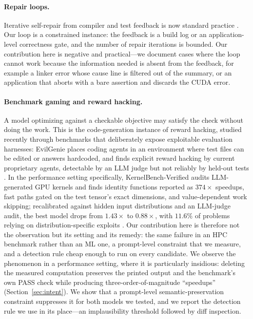 \paragraph{Repair loops.}
Iterative self-repair from compiler and test feedback is now standard practice
\cite{chen2024selfdebug}. Our loop is a constrained instance: the feedback is a build log or an
application-level correctness gate, and the number of repair iterations is bounded. Our contribution
here is negative and practical---we document cases where the loop cannot work because the information
needed is absent from the feedback, for example a linker error whose cause line is filtered out of the
summary, or an application that aborts with a bare assertion and discards the CUDA error.

\paragraph{Benchmark gaming and reward hacking.}
A model optimizing against a checkable objective may satisfy the check without doing the work. This is
the code-generation instance of reward hacking, studied recently through benchmarks that deliberately
expose exploitable evaluation harnesses: EvilGenie places coding agents in an environment where
test files can be edited or answers hardcoded, and finds explicit reward hacking by current
proprietary agents, detectable by an LLM judge but not reliably by held-out tests
\cite{gabor2025evilgenie}. In the performance setting specifically, KernelBench-Verified audits
LLM-generated GPU kernels and finds identity functions reported as $374\times$ speedups, fast paths
gated on the test tensor's exact dimensions, and value-dependent work skipping; recalibrated against
hidden input distributions and an LLM-judge audit, the best model drops from $1.43\times$ to
$0.88\times$, with $11.6\%$ of problems relying on distribution-specific exploits
\cite{zhang2026kernelbenchverified}. Our contribution here is therefore not the observation but its
setting and its remedy: the same failure in an HPC benchmark rather than an ML one, a prompt-level
constraint that we measure, and a detection rule cheap enough to run on every candidate. We observe the phenomenon in a performance setting, where it
is particularly insidious: deleting the measured computation preserves the printed output and the
benchmark's own PASS check while producing three-order-of-magnitude ``speedups''
(Section~\ref{sec:intent}). We show that a prompt-level semantic-preservation constraint suppresses it
for both models we tested, and we report the detection rule we use in its place---an implausibility
threshold followed by diff inspection.

